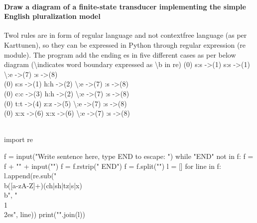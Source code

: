 \documentclass{report}
\begin{document}
\paragraph{Draw a diagram of a finite-state transducer implementing the simple English pluralization model}
Twol rules are in form of regular language and not context\textendash free language (as per Karttunen), so they can be expressed in Python through regular expression (re module). The program add the ending \textendash es in five different cases as per below diagram (\textbackslash indicates word boundary expressed as \textbackslash b in re)
(0) s:s -\textgreater (1) s:s -\textgreater (1) \textbackslash:e -\textgreater (7) \textepsilon:s -\textgreater (8)\\
(0) s:s -\textgreater (1) h:h -\textgreater (2) \textbackslash:e -\textgreater (7) \textepsilon:s -\textgreater (8)\\
(0) c:c -\textgreater (3) h:h -\textgreater (2) \textbackslash:e -\textgreater (7) \textepsilon:s -\textgreater (8)\\
(0) t:t -\textgreater (4) z:z -\textgreater (5) \textbackslash:e -\textgreater (7) \textepsilon:s -\textgreater (8)\\
(0) x:x -\textgreater (6) x:x -\textgreater (6) \textbackslash:e -\textgreater (7) \textepsilon:s -\textgreater (8)\\
\\
\begin{verbatimtab}[4]
import re

f = input("Write sentence here, type END to escape: ")
while "END" not in f:
	f = f + "\n" + input("")
f = f.rstrip(" END")
f = f.split("\n")
l = []
for line in f:
	l.append(re.sub("\\b([a-zA-Z]+)(ch|sh|tz|s|x)\\b", "\\1\\2es", line))
print("\n".join(l))
\end{verbatimtab}
\end{document}
